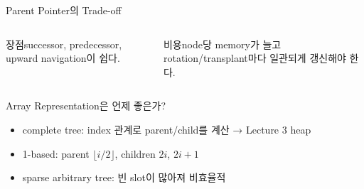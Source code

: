 \begin{frame}{Parent Pointer의 Trade-off}
\begin{columns}[T]\begin{block}{장점}successor, predecessor, upward navigation이 쉽다.\end{block}
\begin{block}{비용}node당 memory가 늘고 rotation/transplant마다 일관되게 갱신해야 한다.\end{block}\end{columns}
\end{frame}
\begin{frame}{Array Representation은 언제 좋은가?}
\begin{itemize}
\item complete tree: index 관계로 parent/child를 계산 → Lecture 3 heap
\item 1-based: parent $\lfloor i/2\rfloor$, children $2i$, $2i+1$
\item sparse arbitrary tree: 빈 slot이 많아져 비효율적
\end{itemize}
\end{frame}
